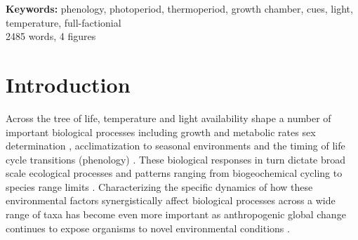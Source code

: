 \documentclass[11pt]{article}
\begin{document}
\textbf{Keywords:} phenology, photoperiod, thermoperiod, growth chamber, cues, light, temperature, full-factionial \\
2485 words, 4 figures
\section*{Introduction}
\noindent Across the tree of life, temperature and light availability shape a number of important biological processes including growth and metabolic rates \citep{MacLean:2019aa} sex determination \citep{Brown:2014vn}, acclimatization to seasonal environments \citep{Hamilton2016} and the timing of life cycle transitions (phenology) \citep{Forrest2010}. These biological responses in turn dictate broad scale ecological processes and patterns ranging from biogeochemical cycling \citep{Piao2007} to species range limits \citep{Chuine2001}. Characterizing the specific dynamics of how these environmental factors synergistically affect biological processes across a wide range of taxa has become even more important as anthropogenic global change continues to expose organisms to novel environmental conditions \citep{Portner:2008vd}.
\end{document}
